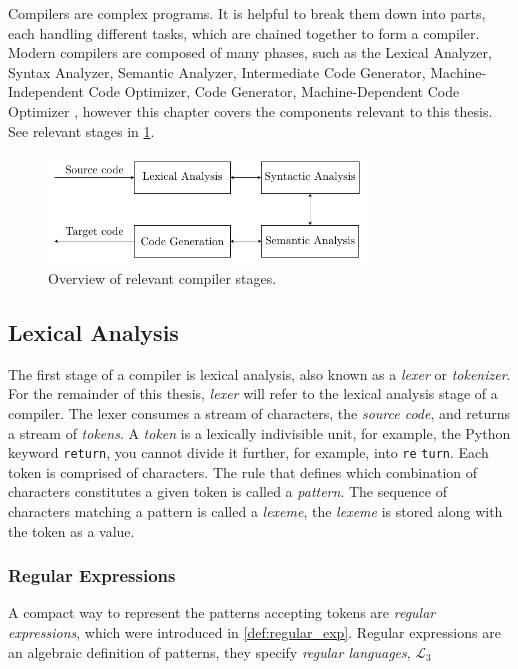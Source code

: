 Compilers are complex programs. It is helpful to break them down into parts, each handling different tasks, which are chained together to form a compiler. Modern compilers are composed of many phases, such as the Lexical Analyzer, Syntax Analyzer, Semantic Analyzer, Intermediate Code Generator, Machine-Independent Code Optimizer, Code Generator, Machine-Dependent Code Optimizer \cite[p. 5]{dragon}, however this chapter covers the components relevant to this thesis. See relevant stages in \cref{fig:compiler-stages}.


\begin{figure}[h]
  \caption{Overview of relevant compiler stages.}
  \label{fig:compiler-stages}
  \centering
  \includegraphics[width=0.75\textwidth]{figures/compiler-stages.pdf}
\end{figure}

\subsection*{Lexical Analysis}
The first stage of a compiler is lexical analysis, also known as a \emph{lexer} or \emph{tokenizer}. For the remainder of this thesis, \emph{lexer} will refer to the lexical analysis stage of a compiler. The lexer consumes a stream of characters, the \emph{source code}, and returns a stream of \emph{tokens}. A \emph{token} is a lexically indivisible unit, for example, the Python keyword \texttt{return}, you cannot divide it further, for example, into \texttt{re} \texttt{turn}. Each token is comprised of characters. The rule that defines which combination of characters constitutes a given token is called a \emph{pattern}. The sequence of characters matching a pattern is called a \emph{lexeme}, the \emph{lexeme} is stored along with the token as a value.



\subsubsection*{Regular Expressions}
A compact way to represent the patterns accepting tokens are \emph{regular expressions}, which were introduced in \cref{def:regular_exp}. Regular expressions are an algebraic definition of patterns, they specify \emph{regular languages}, $\mathcal{L}_3$

